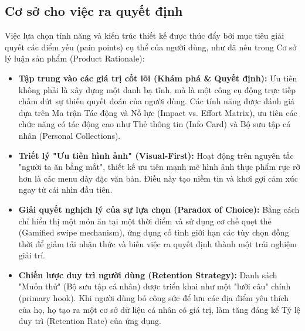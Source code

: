 \subsection{Cơ sở cho việc ra quyết định}
Việc lựa chọn tính năng và kiến trúc thiết kế được thúc đẩy bởi mục tiêu giải quyết các điểm yếu (pain points) cụ thể của người dùng, như đã nêu trong Cơ sở lý luận sản phẩm (Product Rationale):
\begin{itemize}
    \item \textbf{Tập trung vào các giá trị cốt lõi (Khám phá \& Quyết định):} Ưu tiên không phải là xây dựng một danh bạ tĩnh, mà là một công cụ động trực tiếp chấm dứt sự thiếu quyết đoán của người dùng. Các tính năng được đánh giá dựa trên Ma trận Tác động và Nỗ lực (Impact vs. Effort Matrix), ưu tiên các chức năng có tác động cao như Thẻ thông tin (Info Card) và Bộ sưu tập cá nhân (Personal Collections).
    \item \textbf{Triết lý "Ưu tiên hình ảnh" (Visual-First):} Hoạt động trên nguyên tắc "người ta ăn bằng mắt", thiết kế ưu tiên mạnh mẽ hình ảnh thực phẩm rực rỡ hơn là các menu dày đặc văn bản. Điều này tạo niềm tin và khơi gợi cảm xúc ngay từ cái nhìn đầu tiên.
    \item \textbf{Giải quyết nghịch lý của sự lựa chọn (Paradox of Choice):} Bằng cách chỉ hiển thị một món ăn tại một thời điểm và sử dụng cơ chế quẹt thẻ (Gamified swipe mechanism), ứng dụng cố tình giới hạn các tùy chọn đồng thời để giảm tải nhận thức và biến việc ra quyết định thành một trải nghiệm giải trí.
    \item \textbf{Chiến lược duy trì người dùng (Retention Strategy):} Danh sách "Muốn thử" (Bộ sưu tập cá nhân) được triển khai như một "lưỡi câu" chính (primary hook). Khi người dùng bỏ công sức để lưu các địa điểm yêu thích của họ, họ tạo ra một cơ sở dữ liệu cá nhân có giá trị, làm tăng đáng kể Tỷ lệ duy trì (Retention Rate) của ứng dụng.
\end{itemize}
